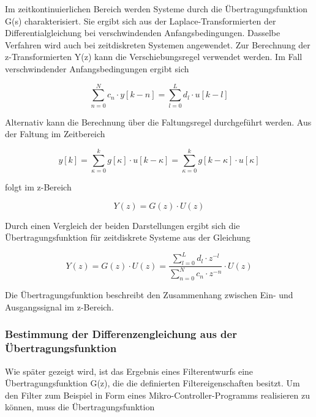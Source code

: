 \noindent Im zeitkontinuierlichen Bereich werden Systeme durch die \"{U}bertragungsfunktion G(s) charakterisiert. Sie ergibt sich aus der Laplace-Transformierten der Differentialgleichung bei verschwindenden Anfangsbedingungen. Dasselbe Verfahren wird auch bei zeitdiskreten Systemen angewendet. Zur Berechnung der z-Transformierten Y(z) kann die Verschiebungsregel verwendet werden. Im Fall verschwindender Anfangsbedingungen ergibt sich 

\begin{equation}\label{eq:sixtwenty}
\sum _{n=0}^{N}c_{n} \cdot y\left[k-n\right] =\sum _{l=0}^{L}d_{l} \cdot u\left[k-l\right]
\end{equation}

\noindent Alternativ kann die Berechnung \"{u}ber die Faltungsregel durchgef\"{u}hrt werden. Aus der Faltung im Zeitbereich

\begin{equation}\label{eq:sixtwentyone}
y\left[k\right]=\sum _{\kappa =0}^{k}g\left[\kappa \right]\cdot u\left[k-\kappa \right] =\sum _{\kappa =0}^{k}g\left[k-\kappa \right]\cdot u\left[\kappa \right]
\end{equation}

\noindent folgt im z-Bereich 

\begin{equation}\label{eq:sixtwentytwo}
Y\left(z\right)=G\left(z\right)\cdot U\left(z\right)
\end{equation}

\noindent Durch einen Vergleich der beiden Darstellungen ergibt sich die \"{U}bertragungsfunktion f\"{u}r zeitdiskrete Systeme aus der Gleichung

\begin{equation}\label{eq:sixtwentythree}
Y\left(z\right)=G\left(z\right)\cdot U\left(z\right)=\frac{\sum _{l=0}^{L}d_{l} \cdot z^{-l}  }{\sum _{n=0}^{N}c_{n} \cdot z^{-n}  } \cdot U\left(z\right)
\end{equation}

\noindent Die \"{U}bertragungsfunktion beschreibt den Zusammenhang zwischen Ein- und Ausgangssignal im z-Bereich. 

\subsubsection{Bestimmung der Differenzengleichung aus der \"{U}bertragungsfunktion}

\noindent Wie sp\"{a}ter gezeigt wird, ist das Ergebnis eines Filterentwurfs eine \"{U}bertragungsfunktion G(z), die die definierten Filtereigenschaften besitzt. Um den Filter zum Beispiel in Form eines Mikro-Controller-Programms realisieren zu k\"{o}nnen, muss die \"{U}bertragungsfunktion 

